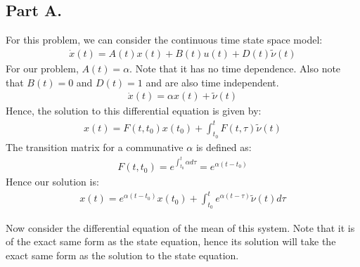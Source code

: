 \documentclass{article}
\begin{document}
\subsection*{Part A.}
For this problem, we can consider the continuous time state space model:
\begin{align*}
\dot{x}(t) = A(t)x(t) + B(t)u(t) + D(t)\tilde{\nu}(t)
\end{align*}
For our problem, $A(t)=\alpha$. Note that it has no time dependence. Also note that $B(t)=0$ and $D(t)=1$ and are also time independent.
\begin{align*}
\dot{x}(t) = \alpha x(t) + \tilde{\nu}(t)
\end{align*}
Hence, the solution to this differential equation is given by:
\begin{align*}
x(t) = F(t,t_0)x(t_0) + \int_{t_0}^{t} F(t,\tau) \tilde{\nu}(t)
\end{align*}
The transition matrix for a communative $\alpha$ is defined as:
\begin{align*}
F(t,t_0)= e^{\int_{t_0}^{t} \alpha d\tau} = e^{\alpha (t-t_0)}
\end{align*}
Hence our solution is:
\begin{align*}
x(t) = e^{\alpha (t-t_0)}x(t_0) + \int_{t_0}^{t} e^{\alpha (t-\tau)} \tilde{\nu}(t) d\tau
\end{align*}
\begin{comment}

The mean of this solution is its expectation:
\begin{align*}
\mathbb{E}[x(t)] = \bar{x}(t) = \mathbb{E}[e^{\alpha (t-t_0)}x(t_0) + \int_{t_0}^{t} e^{\alpha t-t_0)} \tilde{\nu}(t) d\tau]
\end{align*}
Exploiting the linearity of the expectation operator we can apply it to each term of %
\begin{align*}
\bar{x}(t) = \mathbb{E}[e^{\alpha (t-t_0)}x(t_0)] + \mathbb{E}[ \int_{t_0}^{t} %
\end{align*}
The left term can be considered constant, and the right expectation can be moved into %
\begin{align*}
\bar{x}(t) = e^{\alpha (t-t_0)}\mathbb{E}[x(t_0)] + \int_{t_0}^{t} e^{\alpha (t-t_0)} %
\end{align*}
\end{comment}
Now consider the differential equation of the mean of this system. Note that it is of the exact same form as the state equation, hence its solution will take the exact same form as the solution to the state equation.
\end{document}
